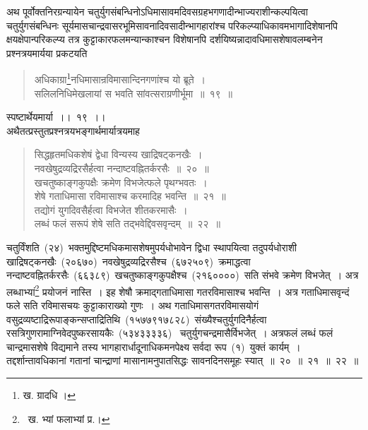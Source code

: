 \documentclass[11pt, openany]{book}
\begin{document}
\indent
अथ पूर्वोक्तनिरग्रन्यायेन चतुर्युगसंबन्धिनोऽधिमासावमदिवसग्रहभगणादीन्भाज्यराशीन्कल्पयित्वा चतुर्युगसंबन्धिनः सूर्यमासचान्द्रवासरभूमिसावनादिवसादीन्भागहारांश्च परिकल्प्याधिकावमभागादिशेषानपि क्षयक्षेपान्परिकल्प्य तत्र कुट्टाकारफलमन्यान्काश्चन विशेषानपि दर्शयिष्यन्नादावधिमासशेषावलम्बनेन प्रश्नत्रयमार्यया प्रकटयति\textendash

\begin{quote}
{\ks अधिकाग्रा\renewcommand\thefootnote{१}\footnote{ख. ग्रादधि ।}नधिमासान्रविमासान्दिनगणांश्च यो ब्रूते~।\\
सलिलनिधिमेखलायां स भवति सांवत्सराग्रणीर्भूमा~॥~१९~॥}
\end{quote}


\newpage
\thispagestyle{fancy}
\fancyhf{}

\indent
स्पष्टार्थेयमार्या~।।~१९~।।\\

\indent
अथैतत्प्रस्तुतप्रश्नत्रयभङ्गार्थमार्यात्रयमाह\textendash

\begin{quote}
{\ks सिद्धहृतमधिकशेषं द्वेधा विन्यस्य खाद्रिषट्कनखैः~।\\
नवखेषुद्रव्यद्रिरसैर्हत्वा नन्दाष्टवह्नितर्करसैः~॥~२०~॥\\
खचतुष्काङ्गकुपक्षैः क्रमेण विभजेत्फले पृथग्भवतः~।\\
शेषे गताधिमासा रविमासाश्च करमादिह भवन्ति~॥~२१~॥\\
तद्योगं युगदिवसैर्हत्वा विभजेत शीतकरमासैः~।\\
लब्धं फलं सरूपं शेषे सति तद्भवेद्दिवसवृन्दम्~॥~२२~॥}
\end{quote}

\indent
चतुर्विंशति~(२४)~भक्तमुद्दिष्टमधिकमासशेषमुपर्यधोभावेन द्विधा स्थापयित्वा तदुपर्यधोराशी खाद्रिषट्कनखैः~(२०६७०)~नवखेषुद्रव्यद्रिरसैश्च~(६७२५०९)~क्रमाद्धत्वा नन्दाष्टवह्नितर्करसैः~(६६३८९)~खचतुष्काङ्गकुपक्षैश्च~(२१६००००)~सति संभवे क्रमेण विभजेत्~। अत्र लब्धाभ्यां\renewcommand\thefootnote{१}\footnote{~ख. भ्यां फलाभ्यां प्र.।} प्रयोजनं नास्ति~। इह शेषौ क्रमाद्गताधिमासा गतरविमासाश्च भवन्ति~। अत्र गताधिमासवृन्दं फले सति रविमासचयः कुट्टाकाराख्यो गुणः~। अथ गताधिमासगतरविमासयोगं वसुद्रव्यष्टाद्रिरूपाङ्कन्सप्ताद्रितिथि~(१५७७९१७८२८)~संख्यैश्चतुर्युगदिनैर्हत्वा रसत्रिगुणरामाग्निवेदपुष्करसायकैः~(५३४३३३३६)~ चतुर्युगचन्द्रमासैर्विभजेत्~। अत्रफलं लब्धं फलं चान्द्रमासशेषे विद्यमाने तस्य भागहारार्धादूनाधिकमनपेक्ष्य सर्वदा रूप~(१)~युक्तं कार्यम्~। तद्दर्शान्तावधिकानां गतानां चान्द्राणां मासानामनुपातसिद्धः सावनदिनसमूहः स्यात्~॥~२०~॥~२१~॥~२२~॥\\
\end{document}
